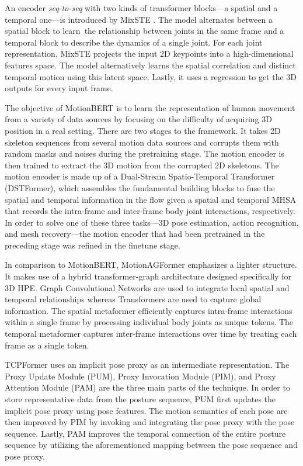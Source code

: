An encoder \textit{seq-to-seq} with two kinds of transformer blocks—a spatial and a temporal one—is introduced by MixSTE \cite{zhang2022mixste}. The model alternates between a spatial block to learn the relationship between joints in 
the same frame and a temporal block to describe the dynamics of a single joint. For each joint representation, MixSTE projects the input 2D keypoints into a high-dimensional features space. The model alternatively learns the spatial 
correlation and distinct temporal motion using this latent space. Lastly, it uses a regression to get the 3D outputs for every input frame.

The objective of MotionBERT \cite{zhu2023motionbert} is to learn the representation of human movement from a variety of data sources by focusing on the difficulty of acquiring 3D position in a real setting. 
There are two stages to the framework. It takes 2D skeleton sequences from several motion data sources and corrupts them with random masks and noises during the pretraining stage. The motion encoder is then trained to extract the 3D 
motion from the corrupted 2D skeletons. The motion encoder is made up of a Dual-Stream Spatio-Temporal Transformer (DSTFormer), which assembles the fundamental building blocks to fuse the spatial and temporal information in the flow 
given a spatial and temporal MHSA that records the intra-frame and inter-frame body joint interactions, respectively. In order to solve one of these three tasks—3D pose estimation, action recognition, and mesh recovery—the motion 
encoder that had been pretrained in the preceding stage was refined in the finetune stage.

In comparison to MotionBERT, MotionAGFormer \cite{mehraban2024motionagformer} emphasizes a lighter structure. It makes use of a hybrid transformer-graph architecture designed specifically for 3D HPE. Graph Convolutional Networks are 
used to integrate local spatial and temporal relationships whereas Transformers are used to capture global information. The spatial metaformer efficiently captures intra-frame interactions within a single frame by processing individual 
body joints as unique tokens. The temporal metaformer captures inter-frame interactions over time by treating each frame as a single token.

TCPFormer \cite{liu2025tcpformer} uses an implicit pose proxy as an intermediate representation. The Proxy Update Module (PUM), Proxy Invocation Module (PIM), and Proxy Attention Module (PAM) are the three main parts of the technique. 
In order to store representative data from the posture sequence, PUM first updates the implicit pose proxy using pose features. The motion semantics of each pose are then improved by PIM by invoking and integrating the pose proxy with 
the pose sequence. Lastly, PAM improves the temporal connection of the entire posture sequence by utilizing the aforementioned mapping between the pose sequence and pose proxy.

